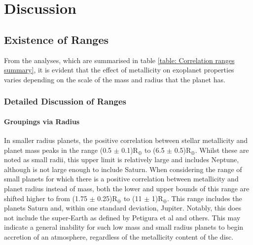 \documentclass[a4paper,twocolumn,12pt]{article}
\begin{document}








\section{Discussion}
\subsection{Existence of Ranges}
From the analyses, which are summarised in table \ref{table: Correlation ranges summary}, it is evident that the effect of metallicity on exoplanet properties varies depending on the scale of the mass and radius that the planet has.

\subsubsection{Detailed Discussion of Ranges}
\vspace{1.5em}
\paragraph{Groupings via Radius}
\vspace{-0.7em}
In smaller radius planets, the positive correlation between stellar metallicity and planet mass peaks in the range (0.5 $\pm$ 0.1)R$_\oplus$ to (6.5 $\pm$ 0.5)R$_\oplus$. Whilst these are noted as small radii, this upper limit is relatively large and includes Neptune, although is not large enough to include Saturn. When considering the range of small planets for which there is a positive correlation between metallicity and planet radius instead of mass, both the lower and upper bounds of this range are shifted higher to from (1.75 $\pm$ 0.25)R$_\oplus$ to (11 $\pm$ 1)R$_\oplus$. This range includes the planets Saturn and, within one standard deviation, Jupiter. Notably, this does not include the super-Earth as defined by Petigura et al and others. This may indicate a general inability for such low mass and small radius planets to begin accretion of an atmosphere, regardless of the metallicity content of the disc.
\end{document}
